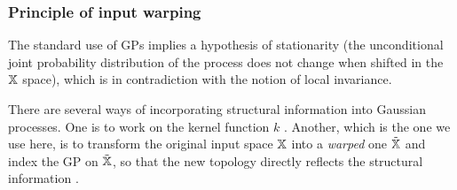 %  
% 
% 
%  
% 
% 
% 

\subsubsection{Principle of input warping}
The standard use of GPs implies a hypothesis of stationarity (the unconditional joint probability distribution of the process does not change when shifted in the $\mathbb{X}$ space),
which is in contradiction with the notion of local invariance.

There are several ways of incorporating structural information into Gaussian processes. 
One is to work on the kernel function $k$ \cite{ginsbourger2013kernels,duvenaud2014automatic}.
Another, which is the one we use here, is to transform the original input space $\mathbb{X}$ into a \textit{warped} one $\tilde {\mathbb{X}}$ 
and index the GP on $\tilde {\mathbb{X}}$, so that the new topology directly reflects the structural information \cite{snoek2014input,marmin2018warped}.

